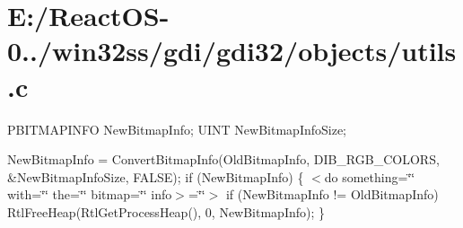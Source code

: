 \hypertarget{_e_1_2_react_o_s-0_84_86_2win32ss_2gdi_2gdi32_2objects_2utils_8c-example}{}\section{E\+:/\+React\+O\+S-\/0../win32ss/gdi/gdi32/objects/utils.\+c}
P\+B\+I\+T\+M\+A\+P\+I\+N\+FO New\+Bitmap\+Info; U\+I\+NT New\+Bitmap\+Info\+Size;

New\+Bitmap\+Info = Convert\+Bitmap\+Info(Old\+Bitmap\+Info, D\+I\+B\+\_\+\+R\+G\+B\+\_\+\+C\+O\+L\+O\+RS, \&New\+Bitmap\+Info\+Size, F\+A\+L\+SE); if (New\+Bitmap\+Info) \{ $<$do something=\char`\"{}\char`\"{} with=\char`\"{}\char`\"{} the=\char`\"{}\char`\"{} bitmap=\char`\"{}\char`\"{} info$>$=\char`\"{}\char`\"{}$>$ if (New\+Bitmap\+Info != Old\+Bitmap\+Info) Rtl\+Free\+Heap(\+Rtl\+Get\+Process\+Heap(), 0, New\+Bitmap\+Info); \}


